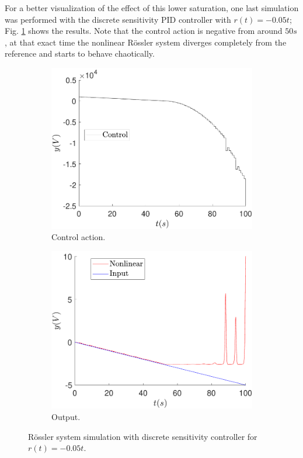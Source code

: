 	For a better visualization of the effect of this lower saturation, one last simulation was performed with the discrete sensitivity PID controller with $r(t)=-0.05t$; Fig. \ref{fig:sens_ref_-0_05t} shows the results. Note that the control action is negative from around $50s$, at that exact time the nonlinear Rössler system diverges completely from the reference and starts to behave chaotically.
    
    \begin{figure}
        \centering
        \begin{subfigure}[b]{0.475\textwidth}
            \centering
            \includegraphics[scale=0.425]{files/heuristic/Sensitivity/control_sens_ramp_ref_-_0_05.pdf}
            \caption{Control action.}
        \end{subfigure}
        \vskip0.1cm
        \begin{subfigure}[b]{0.475\textwidth}   
            \centering 
            \includegraphics[scale=0.425]{files/heuristic/Sensitivity/sens_ramp_ref_-0_05.pdf}
            \caption{Output.}
        \end{subfigure}
        \caption{Rössler system simulation with discrete sensitivity controller for $r(t)=-0.05t$.}
        \label{fig:sens_ref_-0_05t}
	\end{figure}
    
